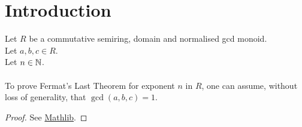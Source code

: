 \chapter{Introduction}











\begin{lemma}
    \label{lmm:fermatLastTheoremWith_of_fermatLastTheoremWith_coprime}
    \leanok
    Let $R$ be a commutative semiring, domain and normalised gcd monoid.\\%
    Let $a, b, c \in R$. \\
    Let $n \in \mathbb{N}$. \\\\
    To prove Fermat's Last Theorem for exponent $n$ in $R$,
    one can assume, without loss of generality, that $\gcd(a,b,c)=1$.
\end{lemma}
\begin{proof}
    \leanok
    See \href{https://pitmonticone.github.io/FLT3/docs/FLT3/Mathlib/NumberTheory/FLT/Basic.html#fermatLastTheoremWith_of_fermatLastTheoremWith_coprime}{Mathlib}.
\end{proof}


